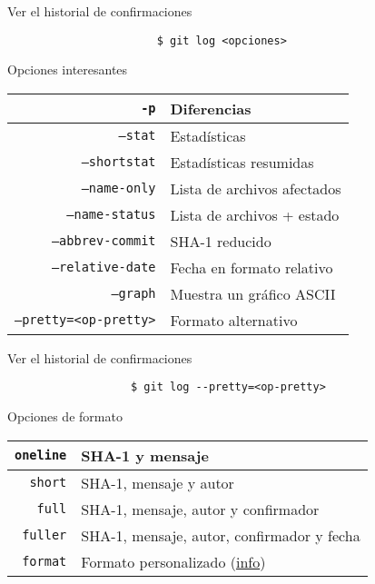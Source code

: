 \begin{frame}[fragile]{Ver el historial de confirmaciones}
  \begin{center}
  \begin{verbatim}
                       $ git log <opciones>
  \end{verbatim}
  \alert{Opciones interesantes}
  \end{center}
  \begin{table}
  \begin{tabular}{|r|l|} \hline
    \texttt{-p} & Diferencias \\ \hline
    \texttt{--stat} & Estadísticas \\ \hline
    \texttt{--shortstat} & Estadísticas resumidas \\ \hline
    \texttt{--name-only} & Lista de archivos afectados \\ \hline
    \texttt{--name-status} & Lista de archivos + estado \\ \hline
    \texttt{--abbrev-commit} & SHA-1 reducido \\ \hline
    \texttt{--relative-date} & Fecha en formato relativo \\ \hline
    \texttt{--graph} & Muestra un gráfico ASCII \\ \hline
    \texttt{--pretty=<op-pretty>} & Formato alternativo \\ \hline
  \end{tabular}
  \end{table}
\end{frame}

\begin{frame}[fragile]{Ver el historial de confirmaciones}
  \begin{center}
  \begin{verbatim}
                   $ git log --pretty=<op-pretty>
  \end{verbatim}
  \alert{Opciones de formato}
  \end{center}
  \begin{table}
  \begin{tabular}{|r|l|} \hline
    \texttt{oneline} & SHA-1 y mensaje \\ \hline
    \texttt{short} & SHA-1, mensaje y autor \\ \hline
    \texttt{full} & SHA-1, mensaje, autor y confirmador \\ \hline
    \texttt{fuller} & SHA-1, mensaje, autor, confirmador y fecha \\ \hline
    \texttt{format} & Formato personalizado (\href{https://git-scm.com/docs/pretty-formats}{info}) \\ \hline
  \end{tabular}
  \end{table}
\end{frame}

